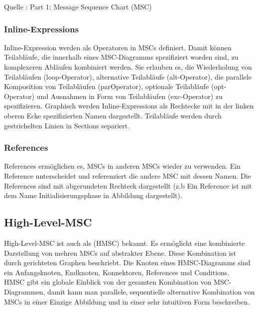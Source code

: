 

Quelle : \cite{MT009}
Part 1: Message Sequence Chart (MSC) 

 

\subsubsection{Inline-Expressions}
Inline-Expression werden als Operatoren in MSCs definiert. Damit können Teilabläufe,
die innerhalb eines MSC-Diagramms spezifiziert worden sind, zu komplexeren Abläufen kombiniert werden. Sie erlauben es, die Wiederholung von Teilabläufen (loop-Operator),
alternative Teilabläufe (alt-Operator), die parallele Komposition von Teilabläufen (parOperator), optionale Teilabläufe (opt-Operator) und Ausnahmen in Form von Teilabläufen (exc-Operator) zu spezifizieren. Graphisch werden Inline-Expressions als Rechtecke mit in der linken oberen Ecke spezifizierten Namen dargestellt. Teilabläufe werden durch gestrichelten Linien in Sections separiert.
\subsubsection{References}
References ermöglichen es, MSCs in anderen MSCs wieder
zu verwenden. 
Ein Reference unterscheidet und referenziert die andere MSC mit dessen Namen. 
Die References sind mit abgerundeten Rechteck dargestellt (z.b Ein Reference ist mit dem Name Initialisierungsphase in Abbildung dargestellt).\\


\subsection{High-Level-MSC}
High-Level-MSC ist auch als (HMSC) bekannt. Es ermöglicht eine kombinierte Darstellung von mehren MSCs auf abstrakter Ebene. Diese Kombination ist durch gerichteten Graphen beschriebt. Die Knoten eines HMSC-Diagramms sind ein Anfangsknoten, Endknoten, Konnektoren, References und Conditions.
\\ HMSC gibt ein globale Einblick von der gesamten Kombination von MSC-Diagrammen, damit kann man parallele, sequentielle alternative
Kombination von MSCs in einer Einzige Abbildung und in einer sehr intuitiven Form beschreiben.\\




